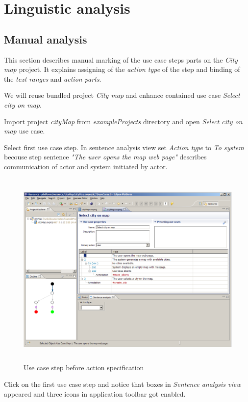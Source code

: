 \section{Linguistic analysis}

\subsection{Manual analysis}
This section describes manual marking of the use case steps parts on the \emph{City map} project. 
It explains assigning of the \emph{action type} of the step and binding of the \emph{text ranges} and \emph{action parts}.

We will reuse bundled project \emph{City map} and enhance contained use case \emph{Select city on map}. 

Import project \emph{cityMap} from \emph{exampleProjects} directory and open \emph{Select city on map} use case.

Select first use case step. In sentence analysis view set \emph{Action type} to \emph{To system}
becouse step sentence \emph{"The user opens the map web page"} describes communication of actor and system initiated by actor.

\begin{figure}[ht]
  \centering
  \includegraphics[height=280pt]{images/manual-analysis/step1-action-not-selected}
  \caption{Use case step before action specification}
  \label{fig:reprotoolUCEditor}
\end{figure}

Click on the first use case step and notice that boxes in \emph{Sentence analysis view} appeared and three icons in application toolbar got enabled.

